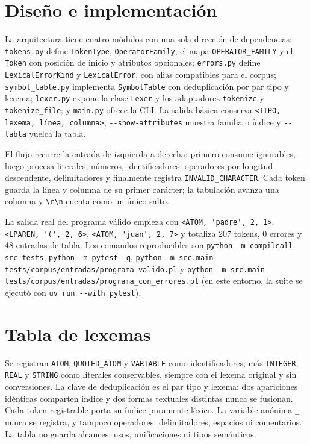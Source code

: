 \documentclass[11pt,a4paper]{article}
\begin{document}
\section{Diseño e implementación}
La arquitectura tiene cuatro módulos con una sola dirección de
dependencias: \verb|tokens.py| define \verb|TokenType|,
\verb|OperatorFamily|, el mapa \verb|OPERATOR_FAMILY| y el
\verb|Token| con posición de inicio y atributos opcionales;
\verb|errors.py| define \verb|LexicalErrorKind| y
\verb|LexicalError|, con alias compatibles para el corpus;
\verb|symbol_table.py| implementa \verb|SymbolTable| con
deduplicación por par tipo y lexema; \verb|lexer.py| expone la clase
\verb|Lexer| y los adaptadores \verb|tokenize| y \verb|tokenize_file|;
y \verb|main.py| ofrece la CLI. La salida básica conserva
\texttt{<TIPO, lexema, línea, columna>}; \verb|--show-attributes|
muestra familia o índice y \verb|--tabla| vuelca la tabla.

El flujo recorre la entrada de izquierda a derecha: primero consume
ignorables, luego procesa literales, números, identificadores,
operadores por longitud descendente, delimitadores y finalmente
registra \verb|INVALID_CHARACTER|. Cada token guarda la
línea y columna de su primer carácter; la tabulación avanza una
columna y \verb|\r\n| cuenta como un único salto.

La salida real del programa válido empieza con
\verb|<ATOM, 'padre', 2, 1>|, \verb|<LPAREN, '(', 2, 6>|,
\verb|<ATOM, 'juan', 2, 7>| y totaliza 207 tokens, 0 errores y 48
entradas de tabla. Los comandos reproducibles son
\verb|python -m compileall src tests|, \verb|python -m pytest -q|,
\verb|python -m src.main tests/corpus/entradas/programa_valido.pl| y
\verb|python -m src.main tests/corpus/entradas/programa_con_errores.pl|
(en este entorno, la suite se ejecutó con \verb|uv run --with pytest|).

\section{Tabla de lexemas}
Se registran \verb|ATOM|, \verb|QUOTED_ATOM| y \verb|VARIABLE| como
identificadores, más \verb|INTEGER|, \verb|REAL| y \verb|STRING| como
literales conservables, siempre con el lexema original y sin
conversiones. La clave de deduplicación es el par tipo y lexema: dos
apariciones idénticas comparten índice y dos formas textuales
distintas nunca se fusionan. Cada token registrable porta su índice
puramente léxico. La variable anónima \verb|_| nunca se registra, y
tampoco operadores, delimitadores, espacios ni comentarios. La tabla
no guarda alcances, usos, unificaciones ni tipos semánticos.
\end{document}

